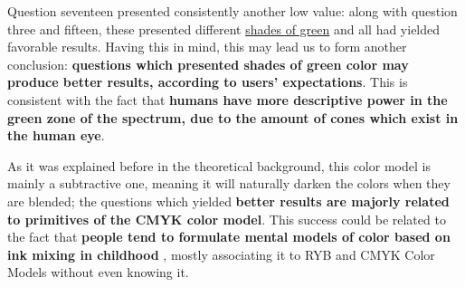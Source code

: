%
Question seventeen presented consistently another low value: along with question three and fifteen, these presented different \ul{shades of green} and all had yielded favorable results. Having this in mind, this may lead us to
form another conclusion: \textbf{questions which presented shades of green color may produce better results, according to users' expectations}. This is consistent with the fact that \textbf{humans have more descriptive power
in the green zone of the spectrum, due to the amount of cones which exist in the human eye}. \par
%
As it was explained before in the theoretical background, this color model is mainly a subtractive one, meaning it will naturally darken the colors when they are blended; the questions which yielded \textbf{better results are majorly
related to primitives of the CMYK color model}. This success could be related to the fact that \textbf{people tend to formulate mental models of color based on ink mixing in childhood} \cite{Gossett2004}, mostly associating it to
RYB and CMYK Color Models without even knowing it. \par
%
